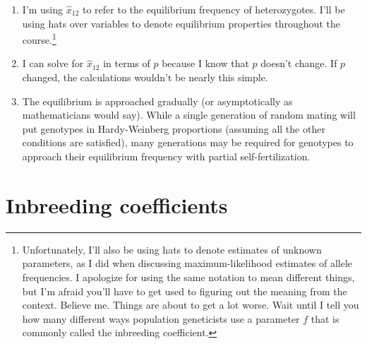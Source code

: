 \documentclass[12pt]{article}
\begin{document}
\begin{enumerate}

\item I'm using $\hat x_{12}$ to refer to the equilibrium frequency of
  heterozygotes. I'll be using hats over variables to denote
  equilibrium properties throughout the
  course.\footnote{Unfortunately, I'll also be using hats to denote
    estimates of unknown parameters, as I did when discussing
    maximum-likelihood estimates of allele frequencies. I apologize
    for using the same notation to mean different things, but I'm
    afraid you'll have to get used to figuring out the meaning from
    the context. Believe me. Things are about to get a lot worse. Wait
    until I tell you how many different ways population geneticists
    use a parameter $f$ that is commonly called the inbreeding
    coefficient.}

\item I can solve for $\hat x_{12}$ in terms of $p$ because I know
  that $p$ doesn't change. If $p$ changed, the calculations wouldn't
  be nearly this simple.

\item The equilibrium is approached gradually (or asymptotically as
  mathematicians would say). While a single generation of random
  mating will put genotypes in Hardy-Weinberg proportions (assuming
  all the other conditions are satisfied), many generations may be
  required for genotypes to approach their equilibrium frequency with
  partial self-fertilization.

\end{enumerate}

\section*{Inbreeding coefficients}
\end{document}
